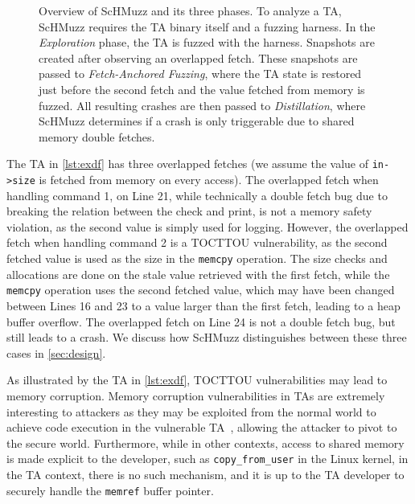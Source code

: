 \documentclass[conference]{IEEEtran}
\newcommand{\sysname}{ScHMuzz\xspace}
\newcommand{\stageone}{Exploration\xspace}
\newcommand{\stagetwo}{Fetch-Anchored Fuzzing\xspace}
\newcommand{\stagethree}{Distillation\xspace}
\begin{document}
\begin{figure}[h!]
  \centering
  
  \caption{
    Overview of \sysname and its three phases. To analyze a TA, \sysname requires the TA binary itself 
    and a fuzzing harness. In the \emph{\stageone} phase, the TA is fuzzed with the harness. Snapshots 
    are created after observing an overlapped fetch. These snapshots are passed to \emph{\stagetwo}, 
    where the TA state is restored just before the second fetch and the value fetched from memory is fuzzed. All resulting crashes 
    are then passed to \emph{\stagethree}, where \sysname determines if a crash is only triggerable 
    due to shared memory double fetches.
    }
  \label{fig:overview}
\end{figure}

The TA in \autoref{lst:exdf} has three overlapped fetches (we assume the value of \texttt{in->size} is fetched from memory 
on every access). The overlapped
fetch when handling command 1, on Line 21, while technically a double fetch bug due to breaking the relation 
between the check and print, is not a memory safety violation, as the second value is simply 
used for logging. However, the overlapped fetch when handling command 2 is a TOCTTOU vulnerability, as the 
second fetched value is used as the size in the \texttt{memcpy} operation. The size checks and allocations are done on the 
stale value retrieved with the first fetch, while the \texttt{memcpy} operation uses the second fetched 
value, which may have been changed between Lines 16 and 23 to a value larger than 
the first fetch, leading to a heap buffer overflow. The overlapped fetch on Line 24 is not a 
double fetch bug, but still leads to a crash. We discuss how \sysname distinguishes between 
these three cases in \autoref{sec:design}.

As illustrated by the TA in \autoref{lst:exdf}, TOCTTOU vulnerabilities may lead to memory 
corruption. Memory corruption vulnerabilities in TAs are extremely interesting 
to attackers as they may be exploited from the normal world to achieve code execution 
in the vulnerable TA~\cite{fiasccco,beniaini2017trustissues,berard2018kinibi,busch2020finding,rollback,globalconfusion,Komaromy2021UnboxYourPhone,Li2024DiveIntoAndroidTA,AdamskiGuilbonPeterlin2019SamsungTrustZone,Makkaveev2019TrustZoneFuzzing,AdamTC}, allowing the attacker to pivot to the secure world.
Furthermore, while in other contexts, access to shared memory is made explicit to 
the developer, such as \texttt{copy\_from\_user} in the Linux kernel, in the TA 
context, there is no such mechanism, and it is up to the TA developer to securely  
handle the \texttt{memref} buffer pointer. 
\end{document}
